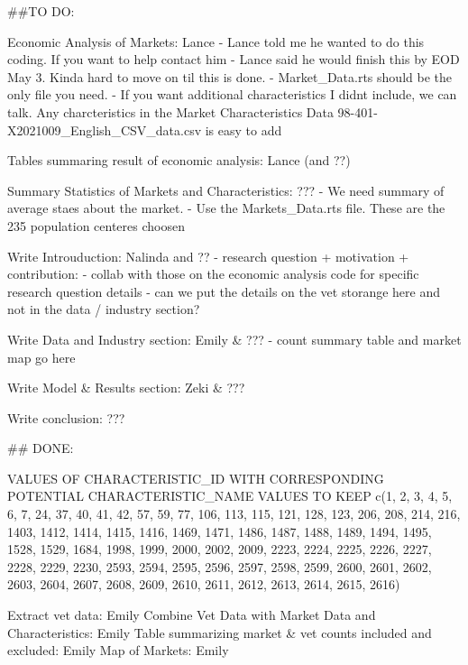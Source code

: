 ##TO DO:

Economic Analysis of Markets: Lance  
    - Lance told me he wanted to do this coding. If you want to help contact him  
    - Lance said he would finish this by EOD May 3. Kinda hard to move on til this is done.   
    - Market_Data.rts should be the only file you need. 
    - If you want additional characteristics I didnt include, we can talk. Any charcteristics in the Market Characteristics Data 98-401-X2021009_English_CSV_data.csv is easy to add

Tables summaring result of economic analysis: Lance (and ??)

Summary Statistics of Markets and Characteristics: ???
    - We need summary of average staes about the market. 
    - Use the Markets_Data.rts file. These are the 235 population centeres choosen

Write Introuduction: Nalinda and ??
    - research question + motivation + contribution: 
    - collab with those on the economic analysis code for specific research question details 
    - can we put the details on the vet storange here and not in the data / industry section? 

Write Data and Industry section: Emily & ???
    - count summary table and market map go here 

Write Model & Results section: Zeki & ???

Write conclusion:  ???

## DONE: 

VALUES OF CHARACTERISTIC_ID WITH CORRESPONDING POTENTIAL CHARACTERISTIC_NAME VALUES TO KEEP 
c(1, 2, 3, 4, 5, 6, 7, 24, 37, 40, 41, 42, 57, 59, 77, 106, 113, 115, 121, 128, 123, 206, 208, 214, 216, 1403, 1412, 1414, 1415, 1416, 1469, 1471, 1486, 1487, 1488, 1489, 1494, 1495, 1528, 1529, 1684, 1998, 1999, 2000, 2002, 2009, 2223, 2224, 2225, 2226, 2227, 2228, 2229, 2230, 2593, 2594, 2595, 2596, 2597, 2598, 2599, 2600, 2601, 2602, 2603, 2604, 2607, 2608, 2609, 2610, 2611, 2612, 2613, 2614, 2615, 2616)

Extract vet data: Emily 
Combine Vet Data with Market Data and Characteristics: Emily 
Table summarizing market & vet counts included and excluded: Emily
Map of Markets: Emily 
